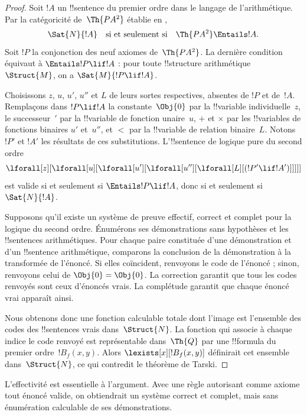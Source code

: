 \documentclass[../../../include/open-logic-section]{subfiles}
\begin{document}
\begin{proof}
Soit $!A$ un !!{sentence} du premier ordre dans
le langage de l'arithmétique. Par la catégoricité
de~$\Th{PA^2}$ établie en
,
\[
\Sat{N}{!A}\quad\text{si et seulement si}\quad
\Th{PA^2}\Entails !A.
\]
Soit $!P$ la conjonction des neuf axiomes
de~$\Th{PA^2}$. La dernière condition équivaut
à $\Entails !P\lif !A$ : pour toute
!!{structure} arithmétique~$\Struct{M}$,
on a $\Sat{M}{!P\lif !A}$.

Choisissons $z$, $u$, $u'$, $u''$ et $L$ de leurs sortes
respectives, absentes de $!P$ et de~$!A$. Remplaçons dans
$!P\lif !A$ la
constante~$\Obj{0}$ par la !!{variable}
individuelle~$z$, le successeur~$\prime$
par la !!{variable} de fonction unaire~$u$,
$+$ et $\times$ par les !!{variable}s de
fonctions binaires $u'$ et~$u''$, et $<$ par la
!!{variable} de relation binaire~$L$.
Notons $!P'$ et $!A'$ les résultats de ces
substitutions. L'!!{sentence} de logique pure
du second ordre
\[
\lforall[z][\lforall[u][\lforall[u'][\lforall[u''][\lforall[L][(!P' \lif !A')]]]]]
\]
est valide si et seulement si $\Entails !P\lif !A$,
donc si et seulement si $\Sat{N}{!A}$.

Supposons qu'il existe un système de preuve effectif, correct et
complet pour la logique du second ordre. Énumérons ses
démonstrations sans hypothèses et les !!{sentence}s
arithmétiques. Pour chaque paire constituée d'une démonstration
et d'un !!{sentence} arithmétique, comparons la conclusion de
la démonstration à la transformée de l'énoncé. Si elles
coïncident, renvoyons le code de l'énoncé ; sinon, renvoyons
celui de $\Obj{0}=\Obj{0}$. La correction garantit que tous les
codes renvoyés sont ceux d'énoncés vrais. La complétude
garantit que chaque énoncé vrai apparaît ainsi.

Nous obtenons donc une fonction calculable totale dont l'image
est l'ensemble des codes des !!{sentence}s vrais dans~$\Struct{N}$.
La fonction qui associe à chaque indice le code renvoyé est
représentable dans~$\Th{Q}$ par une !!{formula} du premier
ordre~$!B_f(x,y)$. Alors $\lexists[x][!B_f(x,y)]$ définirait
cet ensemble dans~$\Struct{N}$, ce qui contredit le théorème de
Tarski.
\end{proof}

L'effectivité est essentielle à l'argument. Avec une règle
autorisant comme axiome tout énoncé valide, on obtiendrait
un système correct et complet, mais sans énumération
calculable de ses démonstrations.
\end{document}
